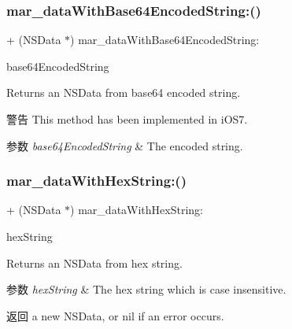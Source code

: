 \subsubsection{\texorpdfstring{mar\+\_\+data\+With\+Base64\+Encoded\+String\+:()}{mar\_dataWithBase64EncodedString:()}}
{\footnotesize\ttfamily + (N\+S\+Data $\ast$) mar\+\_\+data\+With\+Base64\+Encoded\+String\+: \begin{DoxyParamCaption}\item[{(N\+S\+String $\ast$)}]{base64\+Encoded\+String }\end{DoxyParamCaption}}

Returns an N\+S\+Data from base64 encoded string.

\begin{DoxyWarning}{警告}
This method has been implemented in i\+O\+S7.
\end{DoxyWarning}

\begin{DoxyParams}{参数}
{\em base64\+Encoded\+String} & The encoded string. \\
\hline
\end{DoxyParams}
\mbox{\label{category_n_s_data_07_m_a_r_e_x_08_aff742dcff64d959c4d7ddc8c037c7a5d}} 
\subsubsection{\texorpdfstring{mar\+\_\+data\+With\+Hex\+String\+:()}{mar\_dataWithHexString:()}}
{\footnotesize\ttfamily + (N\+S\+Data $\ast$) mar\+\_\+data\+With\+Hex\+String\+: \begin{DoxyParamCaption}\item[{(N\+S\+String $\ast$)}]{hex\+String }\end{DoxyParamCaption}}

Returns an N\+S\+Data from hex string.


\begin{DoxyParams}{参数}
{\em hex\+String} & The hex string which is case insensitive.\\
\hline
\end{DoxyParams}
\begin{DoxyReturn}{返回}
a new N\+S\+Data, or nil if an error occurs. 
\end{DoxyReturn}
\mbox{\label{category_n_s_data_07_m_a_r_e_x_08_a8a8055c8b6ebfe96d1a49ba5ecff40d7}} 
